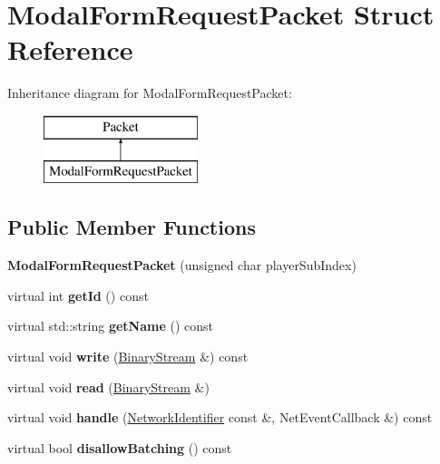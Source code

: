\hypertarget{struct_modal_form_request_packet}{}\section{Modal\+Form\+Request\+Packet Struct Reference}
\label{struct_modal_form_request_packet}
Inheritance diagram for Modal\+Form\+Request\+Packet\+:\begin{figure}[H]
\begin{center}
\leavevmode
\includegraphics[height=2.000000cm]{struct_modal_form_request_packet}
\end{center}
\end{figure}
\subsection*{Public Member Functions}
\begin{DoxyCompactItemize}
\item 
\mbox{\label{struct_modal_form_request_packet_add091ff2e2a22fb025f4f652b38ab60a}} 
{\bfseries Modal\+Form\+Request\+Packet} (unsigned char player\+Sub\+Index)
\item 
\mbox{\label{struct_modal_form_request_packet_a3ebf07486ce15d760d939fdc31e6a52a}} 
virtual int {\bfseries get\+Id} () const
\item 
\mbox{\label{struct_modal_form_request_packet_a065c043651477df0e6311723a42ac78e}} 
virtual std\+::string {\bfseries get\+Name} () const
\item 
\mbox{\label{struct_modal_form_request_packet_a4b181c4879bf89e547c7ebfa7f8b38e0}} 
virtual void {\bfseries write} (\mbox{\hyperlink{struct_binary_stream}{Binary\+Stream}} \&) const
\item 
\mbox{\label{struct_modal_form_request_packet_a4aeba078a754acbf613e230803ecfbc1}} 
virtual void {\bfseries read} (\mbox{\hyperlink{struct_binary_stream}{Binary\+Stream}} \&)
\item 
\mbox{\label{struct_modal_form_request_packet_a478a91c0845a9e8aa11d982969e4e4fc}} 
virtual void {\bfseries handle} (\mbox{\hyperlink{struct_network_identifier}{Network\+Identifier}} const \&, Net\+Event\+Callback \&) const
\item 
\mbox{\label{struct_modal_form_request_packet_a00fedc2527ae5d28a0e3c59e8ef581b4}} 
virtual bool {\bfseries disallow\+Batching} () const
\end{DoxyCompactItemize}
